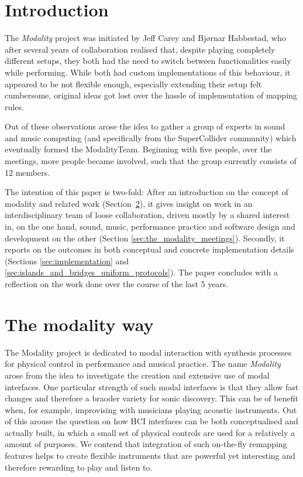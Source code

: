 \documentclass{article}
\begin{document}
\section{Introduction}
\label{sec:introduction}

The \textit{Modality} project was initiated by Jeff Carey and Bj\o{}rnar Habbestad, who after several years of collaboration realised that, despite playing completely different setups, they both had the need to switch between functionalities easily while performing.  While both had custom implementations of this behaviour, it appeared to be not flexible enough, especially extending their setup felt cumbersome, original ideas got lost over the hassle of implementation of mapping rules.

Out of these observations arose the idea to gather a group of experts in sound and music computing (and specifically from the SuperCollider community) which eventually formed the ModalityTeam.
Beginning with five people, over the meetings, more people became involved, such that the group currently consists of 12 members.

The intention of this paper is two-fold:
After an introduction on the concept of modality and related work (Section~\ref{sec:modal_control}), it gives insight on work in an interdisciplinary team of loose collaboration, driven mostly by a shared interest in, on the one hand, sound, music, performance practice and software design and development on the other (Section \ref{sec:the_modality_meetings}).
Secondly, it reports on the outcomes in both conceptual and concrete implementation details (Sections \ref{sec:implementation} and \ref{sec:islands_and_bridges_uniform_protocols}).
The paper concludes with a reflection on the work done over the course of the last 5 years.

\section{The modality way}
\label{sec:modal_control}

The Modality project is dedicated to modal interaction with synthesis processes for physical control in performance and musical practice.
The name \emph{Modality} arose from the idea to investigate the creation and extensive use of modal interfaces.
One particular strength of such modal interfaces is that they allow fast changes and therefore a braoder variety for sonic discovery.
This can be of benefit when, for example, improvising with musicians playing acoustic instruments.
Out of this arouse the question on how HCI interfaces can be both conceptualised and actually built, in which a small set of physical controls are used for a relatively a amount of purposes.
We contend that integration of such on-the-fly remapping features helps to create flexible instruments that are powerful yet interesting and therefore rewarding to play and listen to. 
\end{document}
